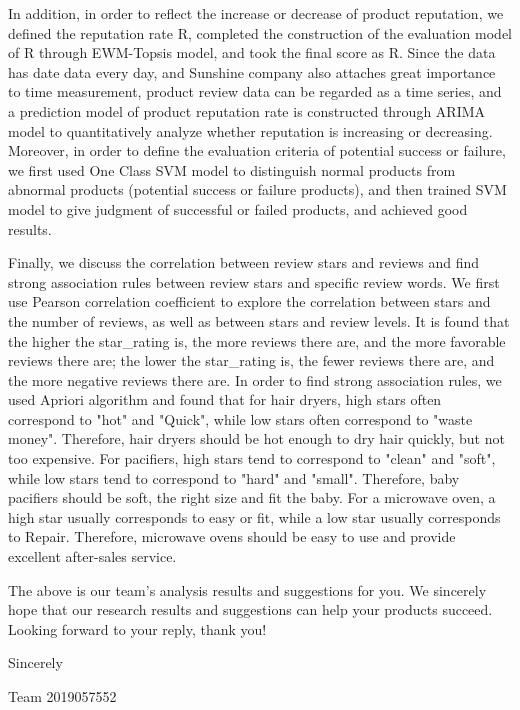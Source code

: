 \documentclass[../mcmpaper]{subfiles}
\begin{document}
    In addition, in order to reflect the increase or decrease of product reputation, we defined the reputation rate R, completed the construction of the evaluation model of R through EWM-Topsis model, and took the final score as R. Since the data has date data every day, and Sunshine company also attaches great importance to time measurement, product review data can be regarded as a time series, and a prediction model of product reputation rate is constructed through ARIMA model to quantitatively analyze whether reputation is increasing or decreasing. Moreover, in order to define the evaluation criteria of potential success or failure, we first used One Class SVM model to distinguish normal products from abnormal products (potential success or failure products), and then trained SVM model to give judgment of successful or failed products, and achieved good results.
    \par
    Finally, we discuss the correlation between review stars and reviews and find strong association rules between review stars and specific review words. We first use Pearson correlation coefficient to explore the correlation between stars and the number of reviews, as well as between stars and review levels. It is found that the higher the star\_rating is, the more reviews there are, and the more favorable reviews there are; the lower the star\_rating is, the fewer reviews there are, and the more negative reviews there are. In order to find strong association rules, we used Apriori algorithm and found that for hair dryers, high stars often correspond to "hot" and "Quick", while low stars often correspond to "waste money". Therefore, hair dryers should be hot enough to dry hair quickly, but not too expensive. For pacifiers, high stars tend to correspond to "clean" and "soft", while low stars tend to correspond to "hard" and "small". Therefore, baby pacifiers should be soft, the right size and fit the baby. For a microwave oven, a high star usually corresponds to easy or fit, while a low star usually corresponds to Repair. Therefore, microwave ovens should be easy to use and provide excellent after-sales service.
    \par
    The above is our team's analysis results and suggestions for you. We sincerely hope that our research results and suggestions can help your products succeed. Looking forward to your reply, thank you!
    \par
    {\hfill Sincerely}
    \par
    {\hfill Team 2019057552}
\end{document}
